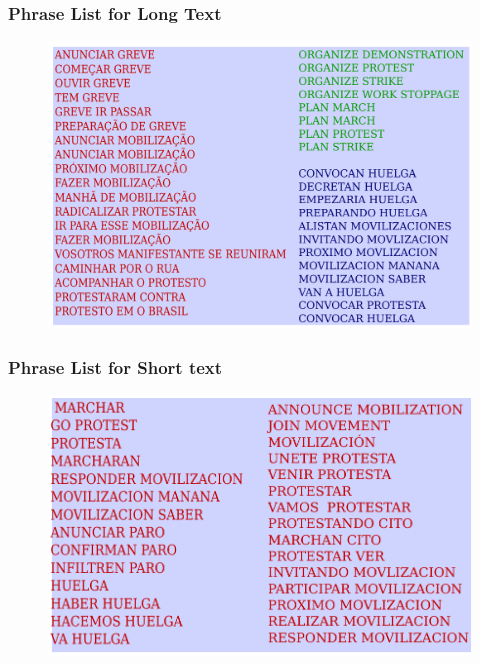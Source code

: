 \documentclass[red,handout]{beamer}
\begin{document}
\begin{frame}
    \frametitle{Phrase List for Long Text}
    \begin{figure}
        \includegraphics[scale=0.5]{wordlist_rss}
    \end{figure}
\end{frame}


\begin{frame}
    \frametitle{Phrase List for Short text}
     \begin{figure}
        \includegraphics[scale=0.5]{wordlist_twitter}
     \end{figure}
\end{frame}
\end{document}
